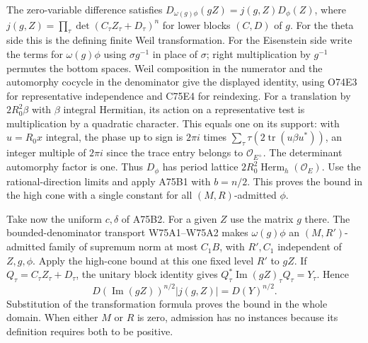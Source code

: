 The zero-variable difference satisfies
$D_{\omega(g)\phi}(gZ)=j(g,Z)D_\phi(Z)$, where
$j(g,Z)=\prod_\tau\det(C_\tau Z_\tau+D_\tau)^n$ for lower blocks
$(C,D)$ of $g$. For the theta side this is the defining finite Weil
transformation. For the Eisenstein side write the terms for
$\omega(g)\phi$ using $\sigma g^{-1}$ in place of $\sigma$; right
multiplication by $g^{-1}$ permutes the bottom spaces. Weil composition
in the numerator and the automorphy cocycle in the denominator give
the displayed identity, using O74E3 for representative independence
and C75E4 for reindexing. For a translation by $2R_0^2\beta$ with
$\beta$ integral Hermitian, its action on a representative test is
multiplication by a quadratic character. This equals one on its
support: with $u=R_0x$ integral, the phase up to sign is $2\pi i$
times $\sum_\tau\tau(2\operatorname{tr}(u\beta u^*))$, an integer
multiple of $2\pi i$ since the trace entry belongs to
$\mathcal O_{E^+}$. The determinant automorphy factor is one. Thus
$D_\phi$ has period lattice $2R_0^2\operatorname{Herm}_h(\mathcal O_E)$.
Use the rational-direction limits and apply A75B1 with $b=n/2$.
This proves the bound in the high cone with a single constant for all
$(M,R)$-admitted $\phi$.

Take now the uniform $c,\delta$ of A75B2. For a given $Z$ use the
matrix $g$ there. The bounded-denominator transport W75A1--W75A2
makes $\omega(g)\phi$ an $(M,R')$-admitted family of supremum norm
at most $C_1B$, with $R',C_1$ independent of $Z,g,\phi$. Apply the
high-cone bound at this one fixed level $R'$ to $gZ$. If
$Q_\tau=C_\tau Z_\tau+D_\tau$, the unitary block identity gives
$Q_\tau^*\operatorname{Im}(gZ)_\tau Q_\tau=Y_\tau$. Hence
\[
  D(\operatorname{Im}(gZ))^{n/2}|j(g,Z)|=D(Y)^{n/2}.
\]
Substitution of the transformation formula proves the bound in the
whole domain. When either $M$ or $R$ is zero, admission has no
instances because its definition requires both to be positive.
